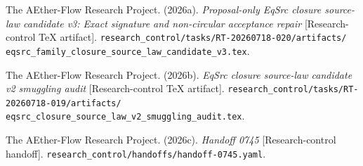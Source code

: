 \documentclass[11pt]{article}
\begin{document}
The AEther-Flow Research Project. (2026a). \emph{Proposal-only EqSrc closure
source-law candidate v3: Exact signature and non-circular acceptance repair}
[Research-control TeX artifact].
\texttt{research\_control/tasks/RT-20260718-020/artifacts/
eqsrc\_family\_closure\_source\_law\_candidate\_v3.tex}.

The AEther-Flow Research Project. (2026b). \emph{EqSrc closure source-law
candidate v2 smuggling audit} [Research-control TeX artifact].
\texttt{research\_control/tasks/RT-20260718-019/artifacts/
eqsrc\_closure\_source\_law\_v2\_smuggling\_audit.tex}.

The AEther-Flow Research Project. (2026c). \emph{Handoff 0745}
[Research-control handoff].
\texttt{research\_control/handoffs/handoff-0745.yaml}.
\end{document}
